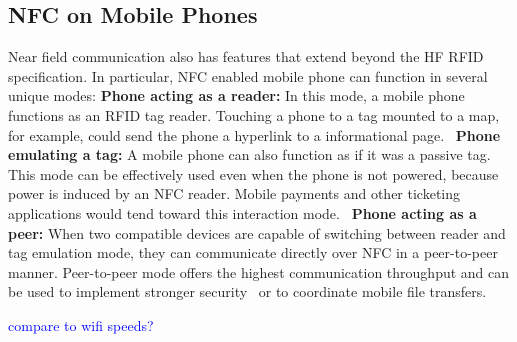 \documentclass{sig-alternate}
\begin{document}
\subsection{NFC on Mobile Phones}
\label{sec:nfcOnPhones}
Near field communication also has features that extend beyond the HF RFID specification. In particular, NFC enabled mobile phone can function in several unique modes:
\vspace{2mm}\newline
\textbf{Phone acting as a reader:}
In this mode, a mobile phone functions as an RFID tag reader. Touching a phone to a tag mounted to a map, for example, could send the phone a hyperlink to a informational page.~\cite{staticDynamicDisplays} 
\vspace{2mm}\newline
\textbf{Phone emulating a tag:}
A mobile phone can also function as if it was a passive tag. This mode can be effectively used even when the phone is not powered, because power is induced by an NFC reader. Mobile payments and other ticketing applications would tend toward this interaction mode.~\cite{Gum2013}
\vspace{2mm}\newline
\textbf{Phone acting as a peer:}
When two compatible devices are capable of switching between reader and tag emulation mode, they can communicate directly over NFC in a peer-to-peer manner. Peer-to-peer mode offers the highest communication throughput and can be used to implement stronger security~\cite{Ticket2011} or to coordinate mobile file transfers.~\cite{Gum2013}

\textcolor{blue}{compare to wifi speeds?}
\end{document}
